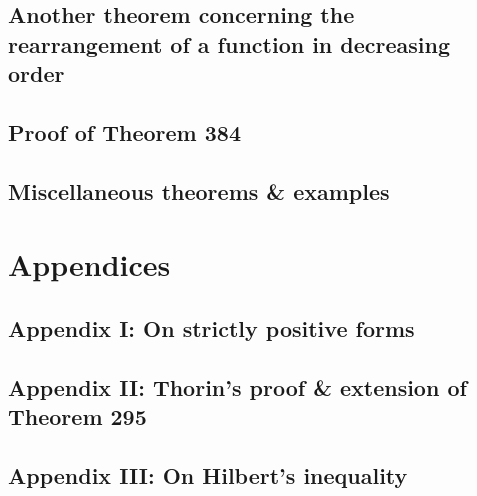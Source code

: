 \documentclass[oneside]{book}
\numberwithin{equation}{section}
\begin{document}
\subsection{Another theorem concerning the rearrangement of a function in decreasing order}

\subsection{Proof of Theorem 384}

\subsection{Miscellaneous theorems \& examples}


\section{Appendices}

\subsection{Appendix I: On strictly positive forms}

\subsection{Appendix II: Thorin's proof \& extension of Theorem 295}

\subsection{Appendix III: On Hilbert's inequality}



\printbibliography[heading=bibintoc]
	
\end{document}
